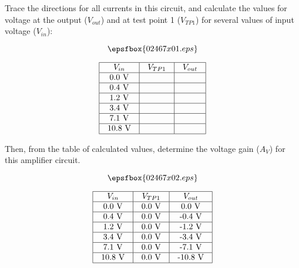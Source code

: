 

Trace the directions for all currents in this circuit, and calculate the values for voltage at the output ($V_{out}$) and at test point 1 ($V_{TP1}$) for several values of input voltage ($V_{in}$):

$$\epsfbox{02467x01.eps}$$


$$\vbox{\offinterlineskip
\halign{\strut
\vrule \quad\hfil # \ \hfil & 
\vrule \quad\hfil # \ \hfil & 
\vrule \quad\hfil # \ \hfil \vrule \cr
\noalign{\hrule}
%
$V_{in}$ & $V_{TP1}$ & $V_{out}$ \cr
%
\noalign{\hrule}
%
0.0 V &  & \cr
%
\noalign{\hrule}
%
0.4 V &  & \cr
%
\noalign{\hrule}
%
1.2 V &  & \cr
%
\noalign{\hrule}
%
3.4 V &  & \cr
%
\noalign{\hrule}
%
7.1 V &  & \cr
%
\noalign{\hrule}
%
10.8 V &  & \cr
%
\noalign{\hrule}
} %
}$$ %

Then, from the table of calculated values, determine the voltage gain ($A_V$) for this amplifier circuit.







$$\epsfbox{02467x02.eps}$$


$$\vbox{\offinterlineskip
\halign{\strut
\vrule \quad\hfil # \ \hfil & 
\vrule \quad\hfil # \ \hfil & 
\vrule \quad\hfil # \ \hfil \vrule \cr
\noalign{\hrule}
%
$V_{in}$ & $V_{TP1}$ & $V_{out}$ \cr
%
\noalign{\hrule}
%
0.0 V & 0.0 V & 0.0 V \cr
%
\noalign{\hrule}
%
0.4 V & 0.0 V & -0.4 V \cr
%
\noalign{\hrule}
%
1.2 V & 0.0 V & -1.2 V \cr
%
\noalign{\hrule}
%
3.4 V & 0.0 V & -3.4 V \cr
%
\noalign{\hrule}
%
7.1 V & 0.0 V & -7.1 V \cr
%
\noalign{\hrule}
%
10.8 V & 0.0 V & -10.8 V \cr
%
\noalign{\hrule}
} %
}$$ %

